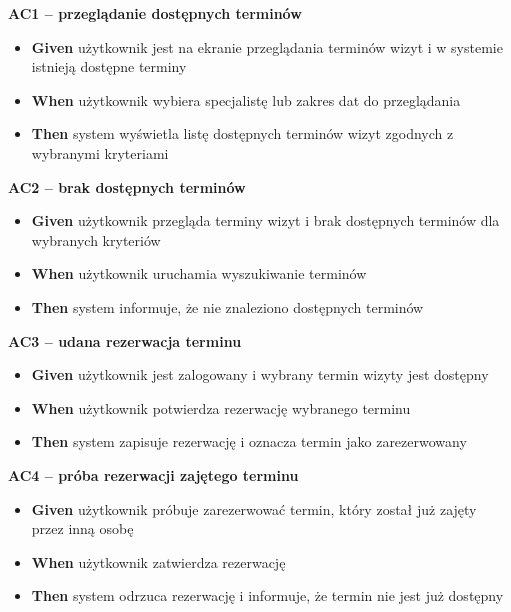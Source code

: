 \documentclass[12pt,a4paper]{article}
\begin{document}
\begin{description}[leftmargin=1.5cm, labelwidth=1cm, labelsep=0.5cm]
\textbf{AC1 -- przeglądanie dostępnych terminów}
\begin{itemize}[itemsep=2pt]
    \item \textbf{Given} użytkownik jest na ekranie przeglądania terminów wizyt i w systemie istnieją dostępne terminy
    \item \textbf{When} użytkownik wybiera specjalistę lub zakres dat do przeglądania
    \item \textbf{Then} system wyświetla listę dostępnych terminów wizyt zgodnych z wybranymi kryteriami
\end{itemize}

\vspace{0.3cm}

\textbf{AC2 -- brak dostępnych terminów}
\begin{itemize}[itemsep=2pt]
    \item \textbf{Given} użytkownik przegląda terminy wizyt i brak dostępnych terminów dla wybranych kryteriów
    \item \textbf{When} użytkownik uruchamia wyszukiwanie terminów
    \item \textbf{Then} system informuje, że nie znaleziono dostępnych terminów
\end{itemize}

\vspace{0.3cm}

\textbf{AC3 -- udana rezerwacja terminu}
\begin{itemize}[itemsep=2pt]
    \item \textbf{Given} użytkownik jest zalogowany i wybrany termin wizyty jest dostępny
    \item \textbf{When} użytkownik potwierdza rezerwację wybranego terminu
    \item \textbf{Then} system zapisuje rezerwację i oznacza termin jako zarezerwowany
\end{itemize}

\vspace{0.3cm}

\textbf{AC4 -- próba rezerwacji zajętego terminu}
\begin{itemize}[itemsep=2pt]
    \item \textbf{Given} użytkownik próbuje zarezerwować termin, który został już zajęty przez inną osobę
    \item \textbf{When} użytkownik zatwierdza rezerwację
    \item \textbf{Then} system odrzuca rezerwację i informuje, że termin nie jest już dostępny
\end{itemize}


\end{description}
\end{document}
